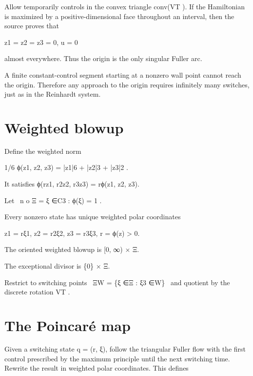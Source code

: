 Allow temporarily controls in the convex triangle conv(VT ). If the Hamiltonian is maximized by a positive-dimensional face throughout an interval, then the source proves that


\begin{displaytext}
z1 = z2 = z3 = 0, u = 0
\end{displaytext}

almost everywhere. Thus the origin is the only singular Fuller arc.


A finite constant-control segment starting at a nonzero wall point cannot reach the origin. Therefore any approach to the origin requires infinitely many switches, just as in the Reinhardt system.


\section{Weighted blowup}

Define the weighted norm


1/6 ϕ(z1, z2, z3) = |z1|6 + |z2|3 + |z3|2 .


It satisfies ϕ(rz1, r2z2, r3z3) = rϕ(z1, z2, z3).


\begin{displaytext}
Let \
n o Ξ = ξ ∈C3 : ϕ(ξ) = 1 .
\end{displaytext}

Every nonzero state has unique weighted polar coordinates


\begin{displaytext}
z1 = rξ1, z2 = r2ξ2, z3 = r3ξ3, r = ϕ(z) > 0.
\end{displaytext}

The oriented weighted blowup is [0, ∞) × Ξ.


The exceptional divisor is \{0\} × Ξ.


\begin{displaytext}
Restrict to switching points \
ΞW = \{ξ ∈Ξ : ξ3 ∈W\} \
and quotient by the discrete rotation VT .
\end{displaytext}

\section{The Poincaré map}

Given a switching state q = (r, ξ), follow the triangular Fuller flow with the first control prescribed by the maximum principle until the next switching time. Rewrite the result in weighted polar coordinates. This defines


